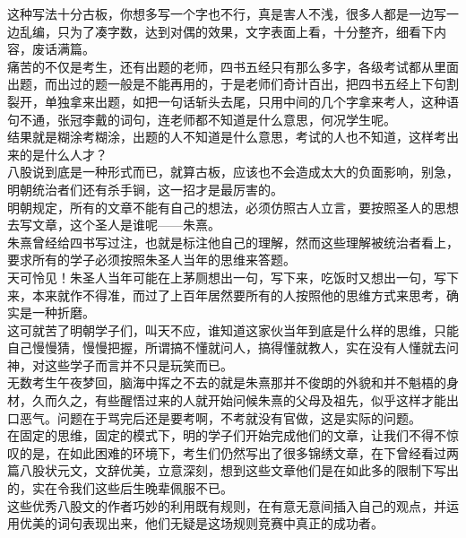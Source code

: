 \begin{multicols}{\theparacolNo}
这种写法十分古板，你想多写一个字也不行，真是害人不浅，很多人都是一边写一边乱编，只为了凑字数，达到对偶的效果，文字表面上看，十分整齐，细看下内容，废话满篇。\\

痛苦的不仅是考生，还有出题的老师，四书五经只有那么多字，各级考试都从里面出题，而出过的题一般是不能再用的，于是老师们奇计百出，把四书五经上下句割裂开，单独拿来出题，如把一句话斩头去尾，只用中间的几个字拿来考人，这种语句不通，张冠李戴的词句，连老师都不知道是什么意思，何况学生呢。\\

结果就是糊涂考糊涂，出题的人不知道是什么意思，考试的人也不知道，这样考出来的是什么人才？\\

八股说到底是一种形式而已，就算古板，应该也不会造成太大的负面影响，别急，明朝统治者们还有杀手锏，这一招才是最厉害的。\\

明朝规定，所有的文章不能有自己的想法，必须仿照古人立言，要按照圣人的思想去写文章，这个圣人是谁呢——朱熹。\\

朱熹曾经给四书写过注，也就是标注他自己的理解，然而这些理解被统治者看上，要求所有的学子必须按照朱圣人当年的思维来答题。\\

天可怜见！朱圣人当年可能在上茅厕想出一句，写下来，吃饭时又想出一句，写下来，本来就作不得准，而过了上百年居然要所有的人按照他的思维方式来思考，确实是一种折磨。\\

这可就苦了明朝学子们，叫天不应，谁知道这家伙当年到底是什么样的思维，只能自己慢慢猜，慢慢把握，所谓搞不懂就问人，搞得懂就教人，实在没有人懂就去问神，对这些学子而言并不只是玩笑而已。\\

无数考生午夜梦回，脑海中挥之不去的就是朱熹那并不俊朗的外貌和并不魁梧的身材，久而久之，有些醒悟过来的人就开始问候朱熹的父母及祖先，似乎这样才能出口恶气。问题在于骂完后还是要考啊，不考就没有官做，这是实际的问题。\\

在固定的思维，固定的模式下，明的学子们开始完成他们的文章，让我们不得不惊叹的是，在如此困难的环境下，考生们仍然写出了很多锦绣文章，在下曾经看过两篇八股状元文，文辞优美，立意深刻，想到这些文章他们是在如此多的限制下写出的，实在令我们这些后生晚辈佩服不已。\\

这些优秀八股文的作者巧妙的利用既有规则，在有意无意间插入自己的观点，并运用优美的词句表现出来，他们无疑是这场规则竞赛中真正的成功者。\\


\end{multicols}
